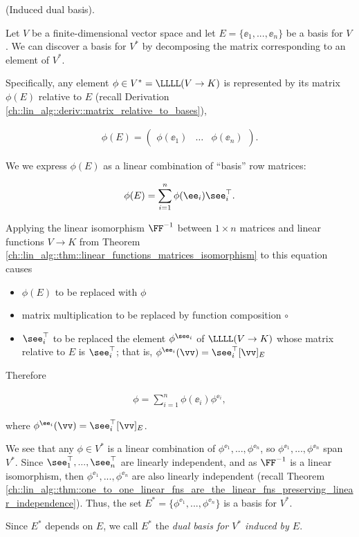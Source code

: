 \begin{deriv}
\label{ch::motivated_intro::deriv::induced_dual_basis}
    (Induced dual basis).
    
    Let $V$ be a finite-dimensional vector space and let $E = \{\ee_1, ..., \ee_n\}$ be a basis for $V$. We can discover a basis for $V^*$ by decomposing the matrix corresponding to an element of $V^*$.
    
    Specifically, any element ${\phi \in V^* = \LLLL(V \rightarrow K)}$ is represented by its matrix $\phi(E)$ relative to $E$ (recall Derivation \ref{ch::lin_alg::deriv::matrix_relative_to_bases}),
    
    \begin{align*}
        \phi(E)
        =
        \begin{pmatrix} 
            \phi(\ee_1) & \hdots & \phi(\ee_n)
        \end{pmatrix}.
    \end{align*}
    
    We we express $\phi(E)$ as a linear combination of ``basis'' row matrices:
    
    \begin{align*}
        \phi(E) = \sum_{i = 1}^n \phi(\ee_i) \see_i^\top.
    \end{align*}
    
    Applying the linear isomorphism $\FF^{-1}$ between $1 \times n$ matrices and linear functions $V \rightarrow K$ from Theorem \ref{ch::lin_alg::thm::linear_functions_matrices_isomorphism} to this equation causes  \begin{itemize}
        \item $\phi(E)$ to be replaced with $\phi$
        \item matrix multiplication to be replaced by function composition $\circ$
        \item $\see_i^\top$ to be replaced the element $\phi^{\see_i}$ of $\LLLL(V \rightarrow K)$ whose matrix relative to $E$ is $\see_i^\top$; that is, $\phi^{\ee_i}(\vv) = \see_i^\top [\vv]_E$
    \end{itemize}

    Therefore
    
    \begin{align*}
        \phi = \sum_{i = 1}^n \phi(\ee_i) \phi^{\ee_i},
    \end{align*}

    where $\phi^{\ee_i}(\vv) = \see_i^\top [\vv]_E$.
    
    We see that any $\phi \in V^*$ is a linear combination of $\phi^{\ee_1}, ..., \phi^{\ee_n}$, so $\phi^{\ee_1}, ..., \phi^{\ee_n}$ span $V^*$. Since $\see_1^\top, ..., \see_n^\top$ are linearly independent, and as $\FF^{-1}$ is a linear isomorphism, then $\phi^{\ee_1}, ..., \phi^{\ee_n}$ are also linearly independent (recall Theorem \ref{ch::lin_alg::thm::one_to_one_linear_fns_are_the_linear_fns_preserving_linear_independence}). Thus, the set ${E^* = \{\phi^{\ee_1}, ..., \phi^{\ee_n}\}}$ is a basis for $V^*$.
    
    Since $E^*$ depends on $E$, we call $E^*$ the \textit{dual basis for $V^*$ induced by $E$}.
\end{deriv}

